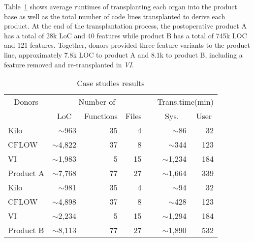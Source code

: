  
Table~\ref{tab:transplantation_time} shows average runtimes of transplanting each organ into the product base as well as the total number of code lines transplanted to derive each product. At the end of the transplantation process, the postoperative product A has a total of 28k LoC and 40 features while product B has a total of 745k LOC and 121 features. Together, donors provided three feature variants to the product line, approximately 7.8k LOC to product A and 8.1k to product B, including a feature removed and re-transplanted in \emph{VI}.

\begin{table}[h]\centering 

    \caption{Case studies results} 
    \label{tab:transplantation_time}
	\begin{center}
	\begin{tabular}{lrrrrrr} \hline
		\multicolumn{1}{c}{Donors} & \multicolumn{3}{c}{Number of}   & &\multicolumn{2}{c}{Trans.time(min)} \\
		\cline{2-4} \cline{6-7}
		 & \multicolumn{1}{c}{LoC}  & \multicolumn{1}{c}{Functions} & \multicolumn{1}{c}{Files} & & \multicolumn{1}{c}{Sys.} & \multicolumn{1}{c}{User}\\\hline
		Kilo        & $\sim$963 & 35 & 4 & & $\sim$86 & 32\\
		CFLOW       & $\sim$4,822 & 37 & 8 &  & $\sim$344 &123 \\
		VI          & $\sim$1,983 & 5 & 15 &  & $\sim$1,234 &184\\\hline
		\rowcolor[gray]{.9} Product A  &$\sim$7,768 & 77 & 27 & & $\sim$1,664 & 339 \\\hline
		Kilo        & $\sim$981 & 35 & 4 & & $\sim$94 & 32\\
		CFLOW       & $\sim$4,898 & 37 & 8 &  & $\sim$428 & 123\\
		VI          & $\sim$2,234 & 5 & 15 &  & $\sim$1,294 & 184\\\hline
		\rowcolor[gray]{.9} Product B  & $\sim$8,113 & 77 & 27 & & $\sim$1,890 &532\\\hline
	\end{tabular}
	\end{center}
	
\end{table}

